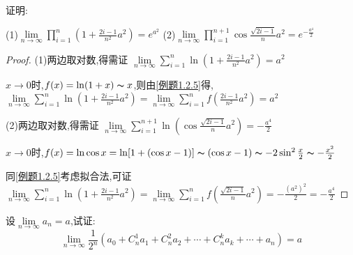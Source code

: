 \begin{practice}
    证明:

    (1)$\lim \limits_{n \to \infty} \prod \limits_{i=1}^{n} (1+\frac{2i-1}{n^2}a^2)=e^{a^2}$\quad
    (2)$\lim \limits_{n \to \infty}  \prod \limits_{i=1}^{n+1} \cos \frac{\sqrt{2i-1}}{n}a^2=e^{-\frac{a^4}{2}}$
\end{practice}

\begin{proof}
    (1)两边取对数,得需证
    $\lim \limits_{n \to \infty} \sum \limits_{i=1}^{n} \ln(1+\frac{2i-1}{n^2}a^2)=a^2$

    $x\to 0$时,$f(x)=\ln (1+x) \thicksim x $,则由\cref{例题1.2.5}得,$\lim \limits_{n \to \infty} \sum \limits_{i=1}^{n} \ln(1+\frac{2i-1}{n^2}a^2)
        =\lim \limits_{n \to \infty} \sum \limits_{i=1}^{n} f(\frac{2i-1}{n^2}a^2)
        =a^2$

    (2)两边取对数,得需证
    $\lim \limits_{n \to \infty} \sum \limits_{i=1}^{n+1} \ln(\cos \frac{\sqrt{2i-1}}{n}a^2)=-\frac{a^4}{2}$

    $x\to 0$时,$f(x)=\ln \cos x=\ln [1+(\cos x-1)] \thicksim (\cos x-1) \thicksim -2\sin^2 \frac{x}{2} \thicksim -\frac{x^2}{2}$

    同\cref{例题1.2.5}考虑拟合法,可证$\lim \limits_{n \to \infty} \sum \limits_{i=1}^{n} \ln(1+\frac{2i-1}{n^2}a^2)
        =\lim \limits_{n \to \infty} \sum \limits_{i=1}^{n} f(\frac{\sqrt{2i-1}}{n}a^2)
        =-\frac{(a^2)^2}{2}
        =-\frac{a^4}{2}$
\end{proof}

\begin{practice}\label{小试牛刀1.2.2}
    设$\lim \limits_{n \to \infty} a_n = a$,试证:
    \begin{equation*}
        \lim \limits_{n \to \infty} \frac{1}{2^n} (a_0+C_n^1 a_1 + C_n^2 a_2 + \cdots + C_n^k a_k + \cdots + a_n)=a
    \end{equation*}
\end{practice}

